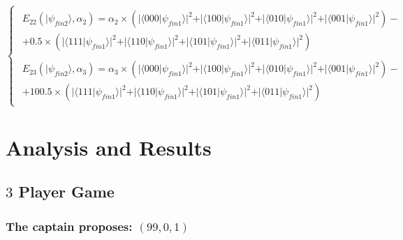  \begin{equation}
\begin{cases}
\begin{split}
E_{22}(\vert\psi_{fin2}\rangle, \alpha_{2})=\alpha_{2}\times(\vert\langle000\vert\psi_{fin1}\rangle\vert^{2} + \vert\langle100\vert\psi_{fin1}\rangle\vert^{2}
+ \vert\langle010\vert\psi_{fin1}\rangle\vert^{2}
+ \vert\langle001\vert\psi_{fin1}\rangle\vert^{2}
 ) - \\
 + 0.5\times(\vert\langle111\vert\psi_{fin1}\rangle\vert^{2} + \vert\langle110\vert\psi_{fin1}\rangle\vert^{2}
+ \vert\langle101\vert\psi_{fin1}\rangle\vert^{2}
+ \vert\langle011\vert\psi_{fin1}\rangle\vert^{2}
 )
\end{split}
\\
\begin{split}
E_{23}(\vert\psi_{fin2}\rangle, \alpha_{3})=\alpha_{3}\times(\vert\langle000\vert\psi_{fin1}\rangle\vert^{2} + \vert\langle100\vert\psi_{fin1}\rangle\vert^{2}
+ \vert\langle010\vert\psi_{fin1}\rangle\vert^{2}
+ \vert\langle001\vert\psi_{fin1}\rangle\vert^{2}
 ) - \\
 + 100.5 \times(\vert\langle111\vert\psi_{fin1}\rangle\vert^{2} + \vert\langle110\vert\psi_{fin1}\rangle\vert^{2}
+ \vert\langle101\vert\psi_{fin1}\rangle\vert^{2}
+ \vert\langle011\vert\psi_{fin1}\rangle\vert^{2}
 )
\end{split}
\end{cases}
\label{eq:pirates_payoff3}
\end{equation}


\section{Analysis and Results}
\label{sec:description_3}


\subsection{$3$ Player Game}
\label{subsec:3playergame}

\subsubsection{The captain proposes: $(99, 0, 1)$}
\label{subsubsec:3playergame99}

